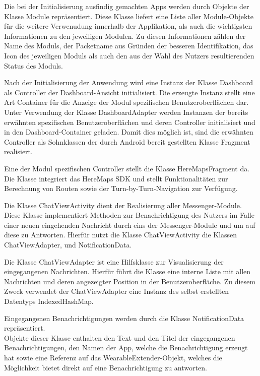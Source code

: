 Die bei der Initialisierung ausfindig gemachten Apps werden durch Objekte der Klasse Module repräsentiert. Diese Klasse liefert eine Liste aller Module-Objekte für die weitere Verwenudung innerhalb der Applikation, als auch die wichtigsten Informationen zu den jeweiligen Modulen. Zu diesen Informationen zählen der Name des Moduls, der Packetname aus Gründen der besseren Identifikation, das Icon des jeweiligen Moduls als auch den aus der Wahl des Nutzers resultierenden Status des Moduls.

Nach der Initialisierung der Anwendung wird eine Instanz der Klasse Dashboard als Controller der Dashboard-Ansicht initialisiert. Die erzeugte Instanz stellt eine Art Container für die Anzeige der Modul spezifischen Benutzeroberflächen dar.\\
Unter Verwendung der Klasse DashboardAdapter werden Instanzen der bereits erwähnten spezifischen Benutzeroberflächen und deren Controller initialisiert und in den Dashboard-Container geladen. Damit dies möglich ist, sind die erwähnten Controller als Sohnklassen der durch Android bereit gestellten Klasse Fragment realisiert.

Eine der Modul spezifischen Controller stellt die Klasse HereMapsFragment da.\\
Die Klasse integriert das HereMaps SDK und stellt Funktionalitäten zur Berechnung von Routen sowie der Turn-by-Turn-Navigation zur Verfügung.

Die Klasse ChatViewActivity dient der Realisierung aller Messenger-Module.\\
Diese Klasse implementiert Methoden zur Benachrichtigung des Nutzers im Falle einer neuen eingehenden Nachricht durch eins der Messenger-Module und um auf diese zu Antworten. Hierfür nutzt die Klasse ChatViewActivity die Klassen ChatViewAdapter, und NotificationData.

Die Klasse ChatViewAdapter ist eine Hilfsklasse zur Visualisierung der eingegangenen Nachrichten. Hierfür führt die Klasse eine interne Liste mit allen Nachrichten und deren angezeigter Position in der Benutzeroberfläche. Zu diesem Zweck verwendet der ChatViewAdapter eine Instanz des selbst erstellten Datentyps IndexedHashMap.

Eingegangenen Benachrichtigungen werden durch die Klasse NotificationData repräsentiert.\\
Objekte dieser Klasse enthalten den Text und den Titel der eingegangenen Benachrichtigungen, den Namen der App, welche die Benachrichtigung erzeugt hat sowie eine Referenz auf das WearableExtender-Objekt, welches die Möglichkeit bietet direkt auf eine Benachrichtigung zu antworten.


